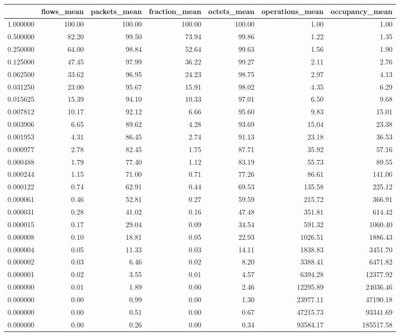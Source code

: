 \begin{tabular}{lrrrrrr}
\toprule
 & flows_mean & packets_mean & fraction_mean & octets_mean & operations_mean & occupancy_mean \\
\midrule
1.000000 & 100.00 & 100.00 & 100.00 & 100.00 & 1.00 & 1.00 \\
0.500000 & 82.20 & 99.50 & 73.94 & 99.86 & 1.22 & 1.35 \\
0.250000 & 64.00 & 98.84 & 52.64 & 99.63 & 1.56 & 1.90 \\
0.125000 & 47.45 & 97.99 & 36.22 & 99.27 & 2.11 & 2.76 \\
0.062500 & 33.62 & 96.95 & 24.23 & 98.75 & 2.97 & 4.13 \\
0.031250 & 23.00 & 95.67 & 15.91 & 98.02 & 4.35 & 6.29 \\
0.015625 & 15.39 & 94.10 & 10.33 & 97.01 & 6.50 & 9.68 \\
0.007812 & 10.17 & 92.12 & 6.66 & 95.60 & 9.83 & 15.01 \\
0.003906 & 6.65 & 89.62 & 4.28 & 93.69 & 15.04 & 23.38 \\
0.001953 & 4.31 & 86.45 & 2.74 & 91.13 & 23.18 & 36.53 \\
0.000977 & 2.78 & 82.45 & 1.75 & 87.71 & 35.92 & 57.16 \\
0.000488 & 1.79 & 77.40 & 1.12 & 83.19 & 55.73 & 89.55 \\
0.000244 & 1.15 & 71.00 & 0.71 & 77.26 & 86.61 & 141.06 \\
0.000122 & 0.74 & 62.91 & 0.44 & 69.53 & 135.58 & 225.12 \\
0.000061 & 0.46 & 52.81 & 0.27 & 59.59 & 215.72 & 366.91 \\
0.000031 & 0.28 & 41.02 & 0.16 & 47.48 & 351.81 & 614.42 \\
0.000015 & 0.17 & 29.04 & 0.09 & 34.54 & 591.32 & 1060.40 \\
0.000008 & 0.10 & 18.81 & 0.05 & 22.93 & 1026.51 & 1886.43 \\
0.000004 & 0.05 & 11.33 & 0.03 & 14.11 & 1838.83 & 3451.70 \\
0.000002 & 0.03 & 6.46 & 0.02 & 8.20 & 3388.41 & 6471.82 \\
0.000001 & 0.02 & 3.55 & 0.01 & 4.57 & 6394.28 & 12377.92 \\
0.000000 & 0.01 & 1.89 & 0.00 & 2.46 & 12295.89 & 24036.46 \\
0.000000 & 0.00 & 0.99 & 0.00 & 1.30 & 23977.11 & 47190.18 \\
0.000000 & 0.00 & 0.51 & 0.00 & 0.67 & 47215.73 & 93341.69 \\
0.000000 & 0.00 & 0.26 & 0.00 & 0.34 & 93584.17 & 185517.58 \\
\bottomrule
\end{tabular}
